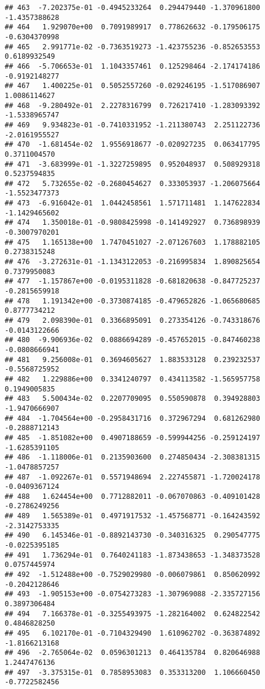 \documentclass[
]{article}
\begin{document}
\begin{verbatim}
## 463  -7.202375e-01 -0.4945233264  0.294479440 -1.370961800 -1.4357388628
## 464   1.929070e+00  0.7091989917  0.778626632 -0.179506175 -0.6304370998
## 465   2.991771e-02 -0.7363519273 -1.423755236 -0.852653553  0.6189932549
## 466  -5.706653e-01  1.1043357461  0.125298464 -2.174174186 -0.9192148277
## 467   1.400225e-01  0.5052557260 -0.029246195 -1.517086907  1.0086114627
## 468  -9.280492e-01  2.2278316799  0.726217410 -1.283093392 -1.5338965747
## 469   9.934823e-01 -0.7410331952 -1.211380743  2.251122736 -2.0161955527
## 470  -1.681454e-02  1.9556918677 -0.020927235  0.063417795  0.3711004570
## 471  -3.683999e-01 -1.3227259895  0.952048937  0.508929318  0.5237594835
## 472   5.732655e-02 -0.2680454627  0.333053937 -1.206075664 -1.5523477373
## 473  -6.916042e-01  1.0442458561  1.571711481  1.147622834 -1.1429465602
## 474   1.350018e-01 -0.9808425998 -0.141492927  0.736898939 -0.3007970201
## 475   1.165138e+00  1.7470451027 -2.071267603  1.178882105  0.2738315248
## 476  -3.272631e-01 -1.1343122053 -0.216995834  1.890825654  0.7379950083
## 477  -1.157867e+00 -0.0195311828 -0.681820638 -0.847725237 -0.2815659918
## 478   1.191342e+00 -0.3730874185 -0.479652826 -1.065680685  0.8777734212
## 479   2.098390e-01  0.3366895091  0.273354126 -0.743318676 -0.0143122666
## 480  -9.906936e-02  0.0886694289 -0.457652015 -0.847460238 -0.0808666941
## 481   9.256008e-01  0.3694605627  1.883533128  0.239232537 -0.5568725952
## 482   1.229886e+00  0.3341240797  0.434113582 -1.565957758  0.1949005835
## 483   5.500434e-02  0.2207709095  0.550590878  0.394928803 -1.9470666907
## 484  -1.704564e+00 -0.2958431716  0.372967294  0.681262980 -0.2888712143
## 485  -1.851082e+00  0.4907188659 -0.599944256 -0.259124197 -1.6285391105
## 486  -1.118006e-01  0.2135903600  0.274850434 -2.308381315 -1.0478857257
## 487  -1.092267e-01  0.5571948694  2.227455871 -1.720024178 -0.0409367124
## 488   1.624454e+00  0.7712882011 -0.067070863 -0.409101428 -0.2786249256
## 489   1.565389e-01  0.4971917532 -1.457568771 -0.164243592 -2.3142753335
## 490   6.145346e-01 -0.8892143730 -0.340316325  0.290547775 -0.0225395185
## 491   1.736294e-01  0.7640241183 -1.873438653 -1.348373528  0.0757445974
## 492  -1.512488e+00 -0.7529029980 -0.006079861  0.850620992 -0.2042128646
## 493  -1.905153e+00 -0.0754273283 -1.307969088 -2.335727156  0.3897306484
## 494   7.166378e-01 -0.3255493975 -1.282164002  0.624822542  0.4846828250
## 495   6.102170e-01 -0.7104329490  1.610962702 -0.363874892 -1.8166213168
## 496  -2.765064e-02  0.0596301213  0.464135784  0.820646988  1.2447476136
## 497  -3.375315e-01  0.7858953083  0.353313200  1.106660450 -0.7722582456

\end{verbatim}
\end{document}
